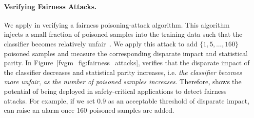 \paragraph{Verifying Fairness Attacks.}
We apply {\fvgm} in verifying a fairness poisoning-attack algorithm. This algorithm injects a small fraction of poisoned samples into the training data such that the classifier becomes relatively unfair~\cite{solans2020poisoning}. We apply this attack to add $\{1, 5, \dots, 160\}$ poisoned samples  and measure the corresponding disparate impact and statistical parity. In Figure~\ref{fvgm_fig:fairness_attacks},  {\fvgm} verifies that the disparate impact of the classifier decreases and statistical parity increases, i.e.\textit{ the classifier becomes more unfair},\textit{ as the number of poisoned samples increases}. Therefore, {\fvgm} shows the potential of being deployed in safety-critical applications to detect fairness attacks. For example, if we set $0.9$ as an acceptable threshold of disparate impact, {\fvgm} can raise an alarm once $160$ poisoned samples are added.


